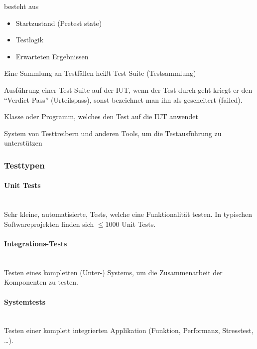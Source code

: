 \documentclass[
    ngerman,
    color=3b,
    summary,
    boxarc,
    main,
]{rubos-tuda-template}
\begin{document}
\begin{definition}
    besteht aus\begin{itemize}
        \item Startzustand (Pretest state)
        \item Testlogik
        \item Erwarteten Ergebnissen
    \end{itemize}
\end{definition}
\begin{definition}
    Eine Sammlung an Testfällen heißt Test Suite (Testsammlung)
\end{definition}
\begin{definition}
    Ausführung einer Test Suite auf der IUT, wenn der Test durch geht kriegt er den \enquote{Verdict Pass} (Urteilspass), sonst bezeichnet man ihn als gescheitert (failed).
\end{definition}
\begin{definition}
    Klasse oder Programm, welches den Test auf die IUT anwendet
\end{definition}
\begin{definition}
    System von Testtreibern und anderen Tools, um die Testausführung zu unterstützen
\end{definition}

\subsubsection{Testtypen}
\paragraph{Unit Tests}\mbox{}\\
Sehr kleine, automatisierte, Tests, welche eine Funktionalität testen. In typischen Softwareprojekten finden sich $ \leq 1000 $ Unit Tests.

\paragraph{Integrations-Tests}\mbox{}\\
Testen eines kompletten (Unter-) Systems, um die Zusammenarbeit der Komponenten zu testen.

\paragraph{Systemtests}\mbox{}\\
Testen einer komplett integrierten Applikation (Funktion, Performanz, Stresstest, \dots).
\clearpage
\end{document}

